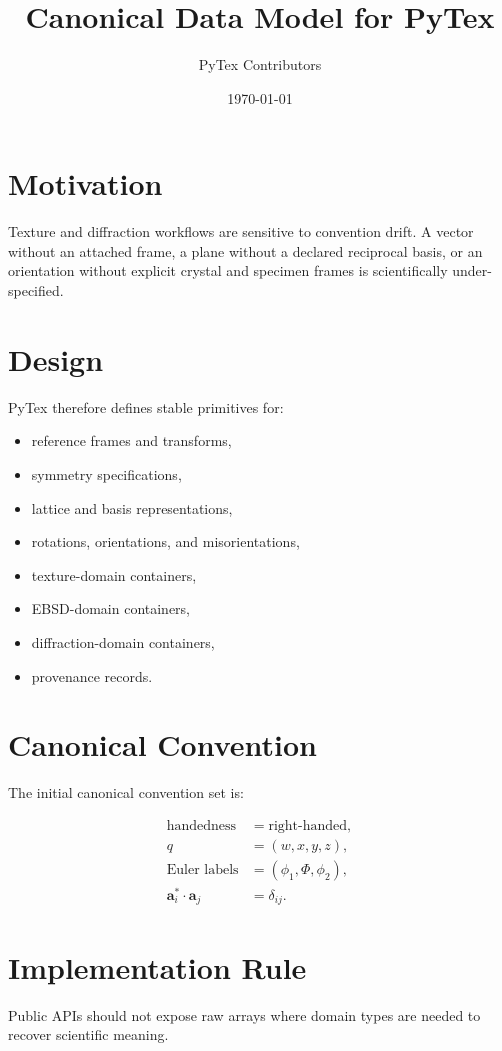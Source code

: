 \documentclass[11pt]{article}
\title{Canonical Data Model for PyTex}
\author{PyTex Contributors}
\date{\today}
\begin{document}
\maketitle

\section{Motivation}

Texture and diffraction workflows are sensitive to convention drift. A vector without an attached frame, a plane without a declared reciprocal basis, or an orientation without explicit crystal and specimen frames is scientifically under-specified.

\section{Design}

PyTex therefore defines stable primitives for:

\begin{itemize}
  \item reference frames and transforms,
  \item symmetry specifications,
  \item lattice and basis representations,
  \item rotations, orientations, and misorientations,
  \item texture-domain containers,
  \item EBSD-domain containers,
  \item diffraction-domain containers,
  \item provenance records.
\end{itemize}

\section{Canonical Convention}

The initial canonical convention set is:

\begin{align*}
  \text{handedness} &= \text{right-handed}, \\
  q &= (w, x, y, z), \\
  \text{Euler labels} &= (\phi_1, \Phi, \phi_2), \\
  \mathbf{a}_i^\ast \cdot \mathbf{a}_j &= \delta_{ij}.
\end{align*}

\section{Implementation Rule}

Public APIs should not expose raw arrays where domain types are needed to recover scientific meaning.
\end{document}
